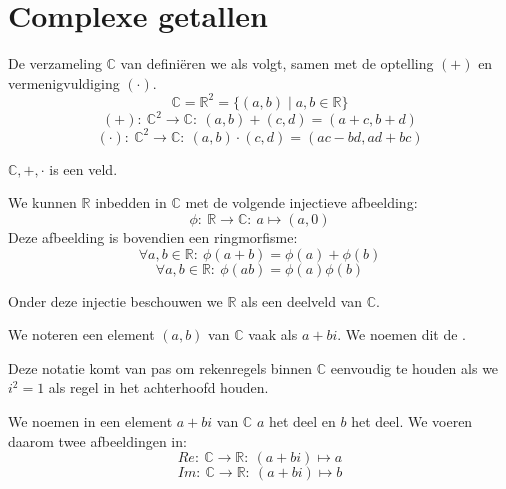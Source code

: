 \documentclass[main.tex]{subfiles}
\begin{document}
\section{Complexe getallen}
\label{sec:complexe-getallen}

\begin{de}
  De verzameling $\mathbb{C}$ van  defini\"eren we als volgt, samen met de optelling $(+)$ en vermenigvuldiging $(\cdot)$.
  \[ \mathbb{C} = \mathbb{R}^{2} = \{ (a,b) \mid a,b\in \mathbb{R} \} \]
  \[ (+):\ \mathbb{C}^{2} \rightarrow \mathbb{C}:\ (a,b) + (c,d) = (a+c,b+d) \]
  \[ (\cdot):\ \mathbb{C}^{2} \rightarrow \mathbb{C}:\ (a,b) \cdot (c,d) = (ac-bd, ad+bc) \]
\end{de}

\begin{st}
  $\mathbb{C},+,\cdot$ is een veld.
\end{st}

\begin{pr}
  We kunnen $\mathbb{R}$ inbedden in $\mathbb{C}$ met de volgende injectieve afbeelding:
  \[ \phi:\ \mathbb{R} \rightarrow \mathbb{C}:\ a \mapsto (a,0) \]
  Deze afbeelding is bovendien een ringmorfisme:
  \[ \forall a,b \in \mathbb{R}:\ \phi(a+b) = \phi(a) + \phi(b) \]
  \[ \forall a,b \in \mathbb{R}:\ \phi(ab) = \phi(a)\phi(b) \] 
\end{pr}

\begin{opm}
  Onder deze injectie beschouwen we $\mathbb{R}$ als een deelveld van $\mathbb{C}$.
\end{opm}

\begin{de}
  We noteren een element $(a,b)$ van $\mathbb{C}$ vaak als $a+bi$.
  We noemen dit de .
\end{de}

\begin{opm}
  Deze notatie komt van pas om rekenregels binnen $\mathbb{C}$ eenvoudig te houden als we $i^{2}=1$ als regel in het achterhoofd houden. 
\end{opm}

\begin{de}
  We noemen in een element $a+bi$ van $\mathbb{C}$ $a$ het  deel en $b$ het  deel.
  We voeren daarom twee afbeeldingen in:
  \[ Re:\ \mathbb{C} \rightarrow \mathbb{R}:\ (a+bi) \mapsto a \]
  \[ Im:\ \mathbb{C} \rightarrow \mathbb{R}:\ (a+bi) \mapsto b \]
\end{de}
\end{document}
